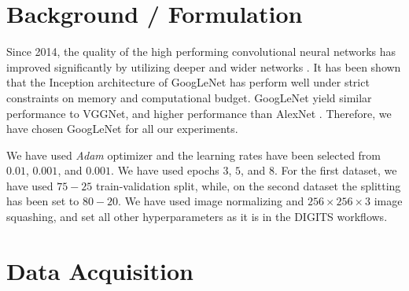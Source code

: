 \documentclass[10pt,journal,compsoc]{IEEEtran}
\begin{document}
\section{Background / Formulation}

Since 2014, the quality of the high performing convolutional neural networks has improved significantly by utilizing deeper and wider networks \cite{44903}. It has been shown that the Inception architecture of GoogLeNet \cite{43022} has perform well under strict constraints on memory and computational budget. GoogLeNet yield similar performance to VGGNet, and higher performance than AlexNet \cite{44903}. Therefore, we have chosen GoogLeNet for all our experiments. 

We have used \textit{Adam} optimizer \cite{journals/corr/KingmaB14} and  the learning rates have been selected from $0.01$, $0.001$, and $0.001$. We have used epochs $3$, $5$, and $8$. For the first dataset, we have used $75-25$ train-validation split, while, on the second dataset the splitting has been set to $80-20$. We have used image normalizing and  $256 \times 256 \times 3$ image squashing, and set all other hyperparameters as it is in the DIGITS workflows.

%
%
%
%
%
%

\section{Data Acquisition}
\end{document}
